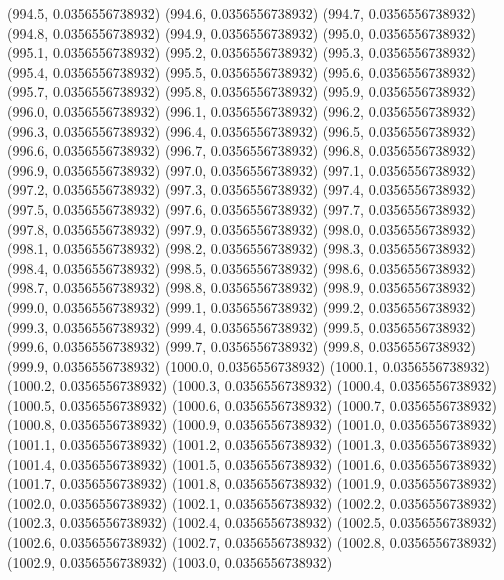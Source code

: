 {					(994.5, 0.0356556738932)
					(994.6, 0.0356556738932)
					(994.7, 0.0356556738932)
					(994.8, 0.0356556738932)
					(994.9, 0.0356556738932)
					(995.0, 0.0356556738932)
					(995.1, 0.0356556738932)
					(995.2, 0.0356556738932)
					(995.3, 0.0356556738932)
					(995.4, 0.0356556738932)
					(995.5, 0.0356556738932)
					(995.6, 0.0356556738932)
					(995.7, 0.0356556738932)
					(995.8, 0.0356556738932)
					(995.9, 0.0356556738932)
					(996.0, 0.0356556738932)
					(996.1, 0.0356556738932)
					(996.2, 0.0356556738932)
					(996.3, 0.0356556738932)
					(996.4, 0.0356556738932)
					(996.5, 0.0356556738932)
					(996.6, 0.0356556738932)
					(996.7, 0.0356556738932)
					(996.8, 0.0356556738932)
					(996.9, 0.0356556738932)
					(997.0, 0.0356556738932)
					(997.1, 0.0356556738932)
					(997.2, 0.0356556738932)
					(997.3, 0.0356556738932)
					(997.4, 0.0356556738932)
					(997.5, 0.0356556738932)
					(997.6, 0.0356556738932)
					(997.7, 0.0356556738932)
					(997.8, 0.0356556738932)
					(997.9, 0.0356556738932)
					(998.0, 0.0356556738932)
					(998.1, 0.0356556738932)
					(998.2, 0.0356556738932)
					(998.3, 0.0356556738932)
					(998.4, 0.0356556738932)
					(998.5, 0.0356556738932)
					(998.6, 0.0356556738932)
					(998.7, 0.0356556738932)
					(998.8, 0.0356556738932)
					(998.9, 0.0356556738932)
					(999.0, 0.0356556738932)
					(999.1, 0.0356556738932)
					(999.2, 0.0356556738932)
					(999.3, 0.0356556738932)
					(999.4, 0.0356556738932)
					(999.5, 0.0356556738932)
					(999.6, 0.0356556738932)
					(999.7, 0.0356556738932)
					(999.8, 0.0356556738932)
					(999.9, 0.0356556738932)
					(1000.0, 0.0356556738932)
					(1000.1, 0.0356556738932)
					(1000.2, 0.0356556738932)
					(1000.3, 0.0356556738932)
					(1000.4, 0.0356556738932)
					(1000.5, 0.0356556738932)
					(1000.6, 0.0356556738932)
					(1000.7, 0.0356556738932)
					(1000.8, 0.0356556738932)
					(1000.9, 0.0356556738932)
					(1001.0, 0.0356556738932)
					(1001.1, 0.0356556738932)
					(1001.2, 0.0356556738932)
					(1001.3, 0.0356556738932)
					(1001.4, 0.0356556738932)
					(1001.5, 0.0356556738932)
					(1001.6, 0.0356556738932)
					(1001.7, 0.0356556738932)
					(1001.8, 0.0356556738932)
					(1001.9, 0.0356556738932)
					(1002.0, 0.0356556738932)
					(1002.1, 0.0356556738932)
					(1002.2, 0.0356556738932)
					(1002.3, 0.0356556738932)
					(1002.4, 0.0356556738932)
					(1002.5, 0.0356556738932)
					(1002.6, 0.0356556738932)
					(1002.7, 0.0356556738932)
					(1002.8, 0.0356556738932)
					(1002.9, 0.0356556738932)
					(1003.0, 0.0356556738932)
}
